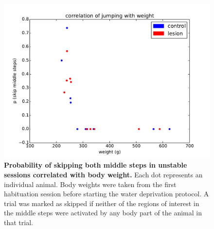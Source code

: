 \begin{figure}
\begin{center}
\includegraphics[width=\columnwidth]{chapters/figuresChBehaviour/correlationJumperWeight}
\end{center}
\vspace{-5mm}
\caption{\textbf{Probability of skipping both middle steps in unstable sessions correlated with body weight.} Each dot represents an individual animal. Body weights were taken from the first habituation session before starting the water deprivation protocol. A trial was marked as skipped if neither of the regions of interest in the middle steps were activated by any body part of the animal in that trial.}
\label{fig:correlationJumperWeight}
\end{figure}
